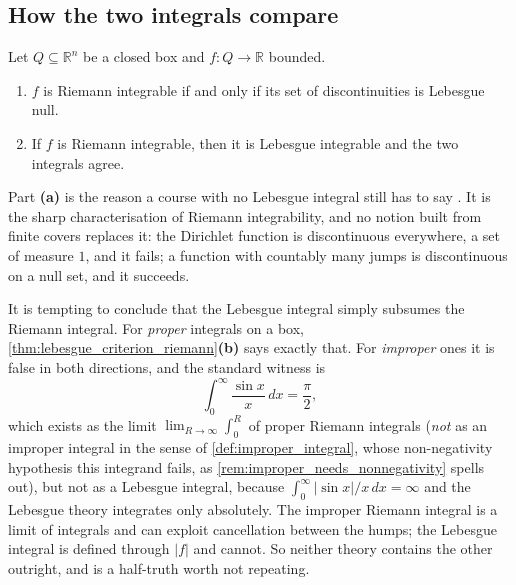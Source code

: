 \subsection{How the two integrals compare}

\begin{theorem}
\label{thm:lebesgue_criterion_riemann}
Let $Q \subseteq \mathbb{R}^n$ be a closed box and $f : Q \to \mathbb{R}$ bounded.
\begin{enumerate}[label=\textbf{(\alph*)}]
  \item $f$ is Riemann integrable if and only if its set of discontinuities is Lebesgue null.
  \item If $f$ is Riemann integrable, then it is Lebesgue integrable and the two integrals agree.
\end{enumerate}
\end{theorem}

Part \textbf{(a)} is the reason a course with no Lebesgue integral still has to say
. It is the sharp characterisation of Riemann integrability, and no notion built
from finite covers replaces it: the Dirichlet function is discontinuous everywhere, a set of
measure $1$, and it fails; a function with countably many jumps is discontinuous on a null set, and
it succeeds.

\begin{ainote}
It is tempting to conclude that the Lebesgue integral simply subsumes the Riemann integral. For
\emph{proper} integrals on a box, \cref{thm:lebesgue_criterion_riemann}\textbf{(b)} says exactly
that. For \emph{improper} ones it is false in both directions, and the standard witness is
\[\int_0^\infty \frac{\sin x}{x}\,dx = \frac{\pi}{2},\]
which exists as the limit $\lim_{R\to\infty}\int_0^R$ of proper Riemann integrals (\emph{not}
as an improper integral in the sense of \cref{def:improper_integral}, whose non-negativity
hypothesis this integrand fails, as \cref{rem:improper_needs_nonnegativity} spells out), but
not as a Lebesgue
integral, because $\int_0^\infty \lvert \sin x\rvert/x \,dx = \infty$ and the Lebesgue theory
integrates only absolutely. The improper Riemann integral is a limit of integrals and can exploit
cancellation between the humps; the Lebesgue integral is defined through $\lvert f\rvert$ and
cannot. So neither theory contains the other outright, and  is a
half-truth worth not repeating.
\end{ainote}

